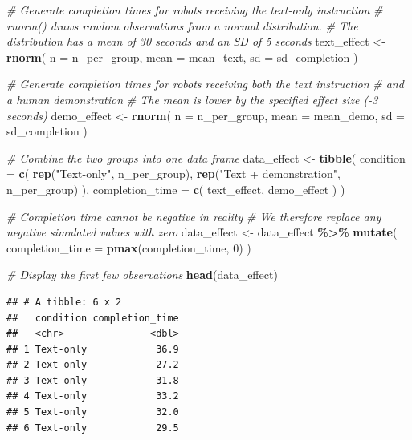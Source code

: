 \documentclass[
]{article}
\newenvironment{Shaded}{\begin{snugshade}}{\end{snugshade}}
\newcommand{\AttributeTok}[1]{\textcolor[rgb]{0.13,0.29,0.53}{#1}}
\newcommand{\CommentTok}[1]{\textcolor[rgb]{0.56,0.35,0.01}{\textit{#1}}}
\newcommand{\DecValTok}[1]{\textcolor[rgb]{0.00,0.00,0.81}{#1}}
\newcommand{\FunctionTok}[1]{\textcolor[rgb]{0.13,0.29,0.53}{\textbf{#1}}}
\newcommand{\NormalTok}[1]{#1}
\newcommand{\OtherTok}[1]{\textcolor[rgb]{0.56,0.35,0.01}{#1}}
\newcommand{\SpecialCharTok}[1]{\textcolor[rgb]{0.81,0.36,0.00}{\textbf{#1}}}
\newcommand{\StringTok}[1]{\textcolor[rgb]{0.31,0.60,0.02}{#1}}
\begin{document}
\begin{Shaded}
\begin{Highlighting}[]
\CommentTok{\# Generate completion times for robots receiving the text{-}only instruction}
\CommentTok{\# rnorm() draws random observations from a normal distribution.}
\CommentTok{\# The distribution has a mean of 30 seconds and an SD of 5 seconds}
\NormalTok{text\_effect }\OtherTok{\textless{}{-}} \FunctionTok{rnorm}\NormalTok{(}
  \AttributeTok{n =}\NormalTok{ n\_per\_group,}
  \AttributeTok{mean =}\NormalTok{ mean\_text,}
  \AttributeTok{sd =}\NormalTok{ sd\_completion}
\NormalTok{)}

\CommentTok{\# Generate completion times for robots receiving both the text instruction}
\CommentTok{\# and a human demonstration}
\CommentTok{\# The mean is lower by the specified effect size ({-}3 seconds)}
\NormalTok{demo\_effect }\OtherTok{\textless{}{-}} \FunctionTok{rnorm}\NormalTok{(}
  \AttributeTok{n =}\NormalTok{ n\_per\_group,}
  \AttributeTok{mean =}\NormalTok{ mean\_demo,}
  \AttributeTok{sd =}\NormalTok{ sd\_completion}
\NormalTok{)}

\CommentTok{\# Combine the two groups into one data frame}
\NormalTok{data\_effect }\OtherTok{\textless{}{-}} \FunctionTok{tibble}\NormalTok{(}
  \AttributeTok{condition =} \FunctionTok{c}\NormalTok{(}
    \FunctionTok{rep}\NormalTok{(}\StringTok{"Text{-}only"}\NormalTok{, n\_per\_group),}
    \FunctionTok{rep}\NormalTok{(}\StringTok{"Text + demonstration"}\NormalTok{, n\_per\_group)}
\NormalTok{  ),}
  \AttributeTok{completion\_time =} \FunctionTok{c}\NormalTok{(}
\NormalTok{    text\_effect,}
\NormalTok{    demo\_effect}
\NormalTok{  )}
\NormalTok{)}

\CommentTok{\# Completion time cannot be negative in reality}
\CommentTok{\# We therefore replace any negative simulated values with zero}
\NormalTok{data\_effect }\OtherTok{\textless{}{-}}\NormalTok{ data\_effect }\SpecialCharTok{\%\textgreater{}\%}
  \FunctionTok{mutate}\NormalTok{(}
    \AttributeTok{completion\_time =} \FunctionTok{pmax}\NormalTok{(completion\_time, }\DecValTok{0}\NormalTok{)}
\NormalTok{  )}

\CommentTok{\# Display the first few observations}
\FunctionTok{head}\NormalTok{(data\_effect)}
\end{Highlighting}
\end{Shaded}

\begin{verbatim}
## # A tibble: 6 x 2
##   condition completion_time
##   <chr>               <dbl>
## 1 Text-only            36.9
## 2 Text-only            27.2
## 3 Text-only            31.8
## 4 Text-only            33.2
## 5 Text-only            32.0
## 6 Text-only            29.5
\end{verbatim}
\end{document}
